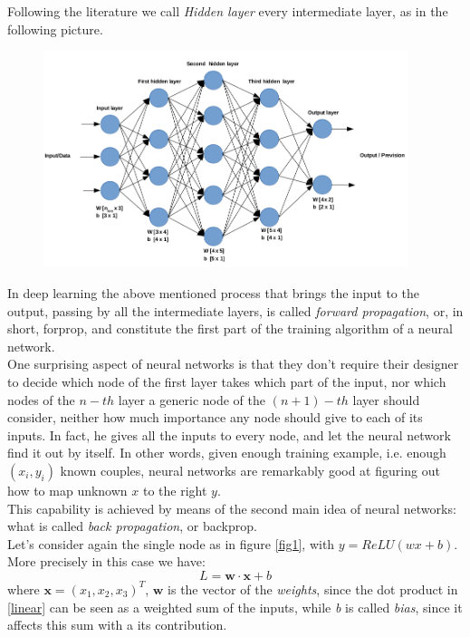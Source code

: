 \documentclass[12pt, a4paper]{report}
\theoremstyle{definition}
\begin{document}
{Following the literature we call \textit{Hidden layer} every intermediate layer, as in the following picture.
\begin{figure}[H]
\centering
\includegraphics[width=0.95\textwidth]{img/neuralnet}
\caption{}\label{neuralnet}
\end{figure}
\noindent In deep learning the above mentioned process that brings the input to the output, passing by all the intermediate layers, is called \textit{forward propagation}, or, in short, forprop, and constitute the first part of the training algorithm of a neural network.\\
\newline \noindent One surprising aspect of neural networks is that they don't require their designer to decide which node of the first layer takes which part of the input, nor which nodes of the $n\!-\!th$ layer a generic node of the $(n+1)\!-\!th$ layer should consider, neither how much importance any node should give to each of its inputs. In fact, he gives all the inputs to every node, and let the neural network find it out by itself. In other words, given enough training example, i.e. enough $(x_i,y_i)$ known couples, neural networks are remarkably good at figuring out how to map unknown $x$ to the right $y$.\\
This capability is achieved by means of the second main idea of neural networks: what is called \textit{back propagation}, or backprop.\\
Let's consider again the single node as in figure \ref{fig1}, with $y=ReLU(wx+b)$. More precisely in this case we have:
\begin{equation}\label{linear}
L=\bm{w \cdot x} + b
\end{equation}
where $\bm x = (x_1,x_2,x_3)^T$, $\bm w$ is the vector of the \textit{weights}, since the dot product in \eqref{linear} can be seen as a weighted sum of the inputs, while \textit{b} is called \textit{bias}, since it affects this sum with a its contribution. \\
}
\end{document}
